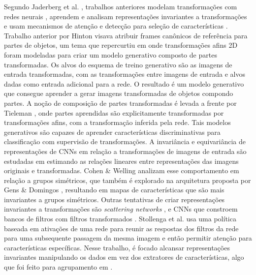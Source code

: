 \documentclass[conference]{IEEEtran}
\begin{document}
Segundo Jaderberg et al. \cite{jaderberg2015spatial}, trabalhos anteriores modelam transformações com redes neurais \cite{hinton1981parallel,hinton2011transforming,tieleman2014optimizing}, aprendem e analisam representações invariantes a transformações \cite{bruna2013invariant,cohen2014transformation,gens2014deep,kanazawa2014locally,lenc2015understanding,sohn2012learning} e usam mecanismos de atenção e detecção para seleção de características \cite{ba2014multiple,erhan2014scalable,girshick2014rich,gregor2015draw,schmidhuber1991learning,sermanet2014attention}.
Trabalho anterior por Hinton \cite{hinton1981parallel} visava atribuir frames canônicos de referência para partes de objetos, um tema que repercurtiu em \cite{hinton2011transforming} onde transformações afins 2D foram modeladas para criar um modelo generativo composto de partes transformadas. Os alvos do esquema de treino generativo são as imagens de entrada transformadas, com as transformações entre imagens de entrada e alvos dadas como entrada adicional para a rede. O resultado é um modelo generativo que consegue aprender a gerar imagens transformadas de objetos compondo partes. A noção de composição de partes transformadas é levada a frente por Tieleman \cite{tieleman2014optimizing}, onde partes aprendidas são explicitamente transformadas por transformações afins, com a transformação inferida pela rede. Tais modelos generativos são capazes de aprender características discriminativas para classificação com supervisão de transformações.
A invariância e equivariância de representações de CNNs em relação a transformações de imagens de entrada são estudadas em \cite{lenc2015understanding} estimando as relações lineares entre representações das imagens originais e transformadas. Cohen \& Welling \cite{cohen2014transformation} analizam esse comportamento em relação a grupos simétricos, que também é explorado na arquitetura proposta por Gens \& Domingos \cite{gens2014deep}, resultando em mapas de características que são mais invariantes a grupos simétricos. Outras tentativas de criar representações invariantes a transformações são \textit{scattering networks} \cite{bruna2013invariant}, e CNNs que constroem bancos de filtros com filtros transformados \cite{kanazawa2014locally,sohn2012learning}.
Stollenga et al. \cite{stollenga2014deep} usa uma política baseada em ativações de uma rede para reunir as respostas dos filtros da rede para uma subsequente passagem da mesma imagem e então permitir atenção para características específicas. Nesse trabalho, é focado alcansar representações invariantes manipulando os dados em vez dos extratores de características, algo que foi feito para agrupamento em \cite{frey2002fast}.
\end{document}

